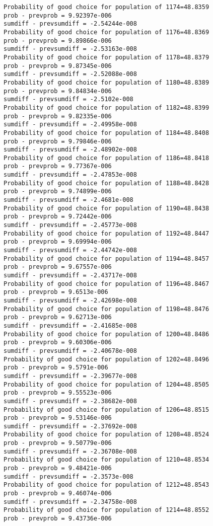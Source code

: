 \documentclass[11pt,onecolumn]{article}
\begin{document}
\begin{verbatim}
Probability of good choice for population of 1174=48.8359
prob - prevprob = 9.92397e-006
sumdiff - prevsumdiff = -2.54244e-008
Probability of good choice for population of 1176=48.8369
prob - prevprob = 9.89866e-006
sumdiff - prevsumdiff = -2.53163e-008
Probability of good choice for population of 1178=48.8379
prob - prevprob = 9.87345e-006
sumdiff - prevsumdiff = -2.52088e-008
Probability of good choice for population of 1180=48.8389
prob - prevprob = 9.84834e-006
sumdiff - prevsumdiff = -2.5102e-008
Probability of good choice for population of 1182=48.8399
prob - prevprob = 9.82335e-006
sumdiff - prevsumdiff = -2.49958e-008
Probability of good choice for population of 1184=48.8408
prob - prevprob = 9.79846e-006
sumdiff - prevsumdiff = -2.48902e-008
Probability of good choice for population of 1186=48.8418
prob - prevprob = 9.77367e-006
sumdiff - prevsumdiff = -2.47853e-008
Probability of good choice for population of 1188=48.8428
prob - prevprob = 9.74899e-006
sumdiff - prevsumdiff = -2.4681e-008
Probability of good choice for population of 1190=48.8438
prob - prevprob = 9.72442e-006
sumdiff - prevsumdiff = -2.45773e-008
Probability of good choice for population of 1192=48.8447
prob - prevprob = 9.69994e-006
sumdiff - prevsumdiff = -2.44742e-008
Probability of good choice for population of 1194=48.8457
prob - prevprob = 9.67557e-006
sumdiff - prevsumdiff = -2.43717e-008
Probability of good choice for population of 1196=48.8467
prob - prevprob = 9.6513e-006
sumdiff - prevsumdiff = -2.42698e-008
Probability of good choice for population of 1198=48.8476
prob - prevprob = 9.62713e-006
sumdiff - prevsumdiff = -2.41685e-008
Probability of good choice for population of 1200=48.8486
prob - prevprob = 9.60306e-006
sumdiff - prevsumdiff = -2.40678e-008
Probability of good choice for population of 1202=48.8496
prob - prevprob = 9.5791e-006
sumdiff - prevsumdiff = -2.39677e-008
Probability of good choice for population of 1204=48.8505
prob - prevprob = 9.55523e-006
sumdiff - prevsumdiff = -2.38682e-008
Probability of good choice for population of 1206=48.8515
prob - prevprob = 9.53146e-006
sumdiff - prevsumdiff = -2.37692e-008
Probability of good choice for population of 1208=48.8524
prob - prevprob = 9.50779e-006
sumdiff - prevsumdiff = -2.36708e-008
Probability of good choice for population of 1210=48.8534
prob - prevprob = 9.48421e-006
sumdiff - prevsumdiff = -2.3573e-008
Probability of good choice for population of 1212=48.8543
prob - prevprob = 9.46074e-006
sumdiff - prevsumdiff = -2.34758e-008
Probability of good choice for population of 1214=48.8552
prob - prevprob = 9.43736e-006

\end{verbatim}
\end{document}
